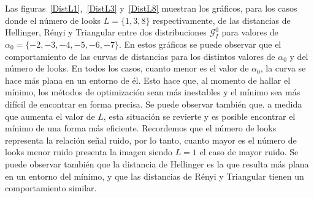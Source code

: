Las figuras~\ref{DistL1},~\ref{DistL3} y~\ref{DistL8} muestran los gráficos, para los casos donde el número de looks $L=\{1,3,8\}$ respectivamente, de las distancias de Hellinger, Rényi y Triangular entre dos distribuciones $\mathcal{G}_I^0$ para valores de $\alpha_0= \{-2,-3,-4,-5,-6,-7\}$. En estos gráficos se puede observar que el comportamiento de las curvas de distancias para los distintos valores de $\alpha_0$ y del número de looks. En todos los casos, cuanto menor es el valor de $\alpha_0$, la curva se hace más plana en un entorno  de él. Esto hace que, al momento de hallar el mínimo, los métodos de optimización sean más inestables y el mínimo sea más difícil de encontrar en forma precisa. Se puede observar también que. a medida que aumenta el valor de $L$, esta situación se revierte y es posible encontrar el mínimo de una forma más eficiente. Recordemos que el número de looks representa la relación señal ruido, por lo tanto, cuanto mayor es el número de looks menor ruido presenta la imagen siendo $L=1$ el caso de mayor ruido. Se puede observar también que la distancia de Hellinger es la que resulta más plana en un entorno del mínimo, y que las distancias de Rényi y Triangular tienen un comportamiento similar.

